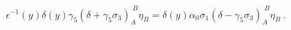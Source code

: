\begin{equation} \label{warunkibrzegbagger}
  \epsilon^{-1}(y) \delta(y) \gamma_5(\delta+\gamma_5\sigma_3)_A^{\;B}\eta_B=\delta(y)\alpha_{0}\sigma_1(\delta-\gamma_{5}\sigma_3)_A^{\;B}\eta_B\ .
    \end{equation} 
